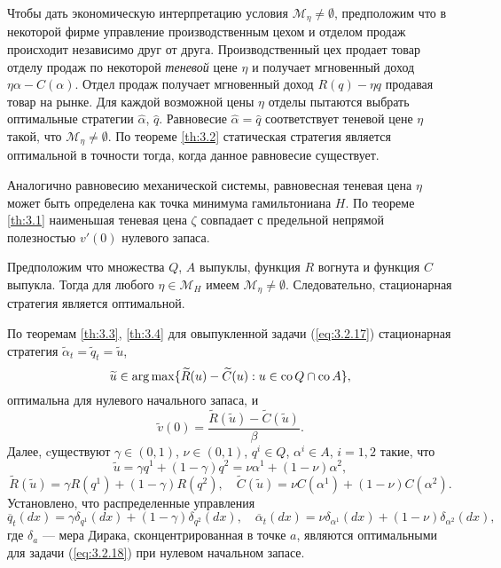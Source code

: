 Чтобы дать экономическую интерпретацию условия $\mathscr M_\eta\neq\emptyset$, предположим что в некоторой фирме управление производственным цехом и отделом продаж происходит независимо друг от друга. Производственный цех продает товар отделу продаж по некоторой \emph{теневой} цене $\eta$ и получает мгновенный доход $\eta\alpha-C(\alpha)$. Отдел продаж получает мгновенный доход $R(q)-\eta q$ продавая товар на рынке. Для каждой возможной цены $\eta$ отделы пытаются выбрать оптимальные стратегии $\widehat\alpha$, $\widehat q$. Равновесие $\widehat\alpha=\widehat q$ соответствует теневой цене $\eta$ такой, что $\mathscr M_\eta\neq\emptyset$. По теореме \ref{th:3.2} статическая стратегия является оптимальной в точности тогда, когда данное равновесие существует.

Аналогично равновесию механической системы, равновесная теневая цена $\eta$ может быть определена как точка минимума гамильтониана $H$. По теореме \ref{th:3.1} наименьшая теневая цена $\zeta$ совпадает с предельной непрямой полезностью $v'(0)$ нулевого запаса.

\begin{theorem} \label{th:3.4}
Предположим что множества $Q$, $A$ выпуклы, функция $R$ вогнута и функция $C$ выпукла.
Тогда для любого $\eta\in\mathscr M_H$ имеем
$\mathscr M_\eta\neq\emptyset$.
Следовательно, стационарная стратегия является оптимальной.
\end{theorem}
По теоремам \ref{th:3.3}, \ref{th:3.4} для овыпукленной задачи (\ref{eq:3.2.17}) стационарная стратегия $\widetilde\alpha_t=\widetilde q_t=\widetilde u$,
\begin{equation} \label{eq:3.3.8}
\widetilde u\in\arg\max\{\widetilde R(u)-\widetilde C(u):u\in{\rm co\,} Q\cap{\rm co\,} A\},
\end{equation}
оптимальна для нулевого начального запаса, и
$$\widetilde v(0)=\frac{\widetilde R(\widetilde u)-\widetilde C(\widetilde u)}{\beta}.$$
Далее, cуществуют $\gamma\in (0,1)$, $\nu\in (0,1)$, $q^i\in Q$, $\alpha^i\in A$, $i=1,2$ такие, что
\begin{equation} \label{eq:3.3.9}
\widetilde u=\gamma q^1+(1-\gamma) q^2=\nu\alpha^1+(1-\nu)\alpha^2,
\end{equation}
\begin{equation} \label{eq:3.3.10}
\widetilde R(\widetilde u)=\gamma R(q^1)+(1-\gamma) R(q^2),\quad \widetilde C(\widetilde u)=\nu C(\alpha^1)+(1-\nu) C(\alpha^2).
\end{equation}
Установлено, что распределенные управления
\begin{equation} \label{eq:3.3.11}
\overline q_t(dx)=\gamma\delta_{q^1}(dx)+(1-\gamma)\delta_{q^2}(dx),\quad
\overline \alpha_t(dx)=\nu\delta_{\alpha^1}(dx)+(1-\nu)\delta_{\alpha^2}(dx),
\end{equation}
где $\delta_a$ --- мера Дирака, сконцентрированная в точке $a$, являются оптимальными для задачи (\ref{eq:3.2.18}) при нулевом начальном запасе.


